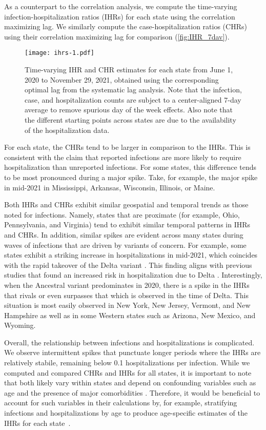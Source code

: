 As a counterpart to the correlation analysis, we compute the time-varying
infection-hospitalization ratios (IHRs) for each state using the correlation
maximizing lag. We similarly compute the case-hospitalization ratios (CHRs)
using their correlation maximizing lag for comparison
(\autoref{fig:IHR_7dav}). 

\begin{figure}[!tb]
\centering
\texttt{[image: ihrs-1.pdf]}
\caption{Time-varying IHR and CHR estimates for each state from June 1, 2020
to November 29, 2021, obtained using the corresponding optimal lag from the
systematic lag analysis. Note that the infection, case, and hospitalization
counts are subject to a center-aligned 7-day average to remove spurious day
of the week effects. Also note that the different starting points across
states are due to the availability of the hospitalization data.}
\label{fig:IHR_7dav}
\end{figure}
    

For each state, the CHRs tend to be larger in comparison to the IHRs. 
This is consistent with the claim that reported infections 
are more likely to require hospitalization than unreported infections. 
For some states, this difference tends to be most pronounced during a major spike. Take, 
for example, the major spike in mid-2021 in Mississippi, Arkansas, Wisconsin, Illinois, or Maine. 

Both IHRs and CHRs exhibit similar
geospatial and temporal trends as those noted for infections. Namely,
states that are proximate (for example, Ohio, Pennsylvania, and Virginia) tend
to exhibit similar temporal patterns in IHRs and CHRs. In addition, similar spikes are evident 
across many states during waves of infections that are driven
by variants of concern. For example, some states exhibit a striking increase in
hospitalizations in mid-2021, which coincides with the rapid takeover of the
Delta variant \citep{hodcroft2021covariants}. This finding aligns with previous
studies that found an increased risk in hospitalization due to Delta
\citep{twohig2022hospital, nyberg2022comparative}. Interestingly, when the
Ancestral variant predominates in 2020, there is a spike in the IHRs that rivals
or even surpasses that which is observed in the time of Delta. This situation is
most easily observed in New York, New Jersey, Vermont, and New Hampshire as well
as in some Western states such as Arizona, New Mexico, and Wyoming.

Overall, the relationship between infections and hospitalizations is
complicated. We observe intermittent spikes that punctuate longer periods where
the IHRs are relatively stabile, remaining below 0.1 hospitalizations per
infection. While we computed and compared CHRs and IHRs for all states, it is
important to note that both likely vary within states and depend on confounding
variables such as age and the presence of major comorbidities
\citep{russell2023comorbidities}. Therefore, it would be beneficial to account
for such variables in their calculations by, for example, stratifying infections
and hospitalizations by age to produce age-specific estimates of the IHRs for
each state~\citep{fox2023disproportionate}.





